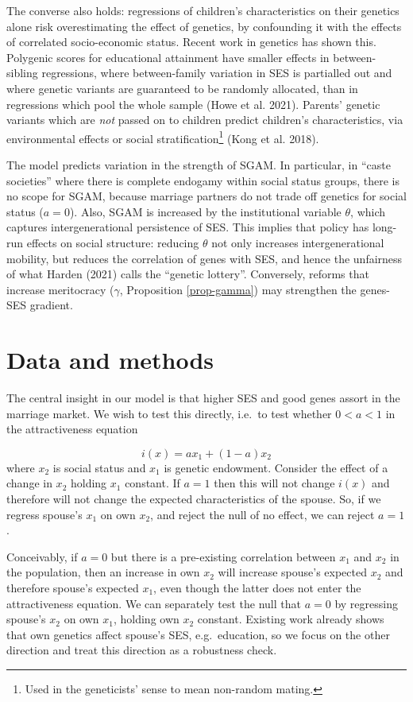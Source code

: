 \documentclass[
  12pt,
]{article}
\theoremstyle{definition}
\theoremstyle{definition}
\theoremstyle{definition}
\theoremstyle{definition}
\theoremstyle{remark}
\begin{document}
The converse also holds: regressions of children's characteristics on their
genetics alone risk overestimating the effect of genetics, by confounding it
with the effects of correlated socio-economic status. Recent work in genetics
has shown this. Polygenic scores for educational attainment have smaller effects
in between-sibling regressions, where between-family variation in SES is
partialled out and where genetic variants are guaranteed to be randomly
allocated, than in regressions which pool the whole sample (Howe et al. 2021).
Parents' genetic variants which are \emph{not} passed on to children predict
children's characteristics, via environmental effects or social stratification\footnote{Used in the geneticists' sense to mean non-random mating.}
(Kong et al. 2018).

The model predicts variation in the strength of SGAM. In particular, in
``caste societies'' where there is complete endogamy within social status
groups, there is no scope for SGAM, because marriage partners do not
trade off genetics for social status (\(a = 0\)). Also, SGAM is increased by the
institutional variable \(\theta\), which captures intergenerational persistence of
SES. This implies that policy has long-run effects on social structure: reducing
\(\theta\) not only increases intergenerational mobility, but reduces
the correlation of genes with SES, and hence the unfairness of what
Harden (2021) calls the ``genetic lottery''. Conversely, reforms that
increase meritocracy (\(\gamma\), Proposition \ref{prop-gamma}) may strengthen the
genes-SES gradient.

\hypertarget{data-and-methods}{%
\section{Data and methods}\label{data-and-methods}}

The central insight in our model is that higher SES and good genes assort in the
marriage market. We wish to test this directly, i.e.~to test whether \(0 < a < 1\)
in the attractiveness equation

\[
i(x) = a x_1 + (1-a) x_2
\]
where \(x_2\) is social status and \(x_1\) is genetic endowment. Consider the effect of a
change in \(x_2\) holding \(x_1\) constant. If \(a = 1\) then this will not change \(i(x)\)
and therefore will not change the expected characteristics of the spouse. So, if we
regress spouse's \(x_1\) on own \(x_2\), and reject the null of no effect, we can reject
\(a = 1\).

Conceivably, if \(a = 0\) but there is a pre-existing correlation between \(x_1\)
and \(x_2\) in the population, then an increase in own \(x_2\) will increase
spouse's expected \(x_2\) and therefore spouse's expected \(x_1\), even though the
latter does not enter the attractiveness equation. We can separately test the
null that \(a = 0\) by regressing spouse's \(x_2\) on own \(x_1\), holding own \(x_2\)
constant. Existing work already shows that own genetics affect spouse's SES,
e.g.~education, so we focus on the other direction and treat this direction as a
robustness check.
\end{document}
